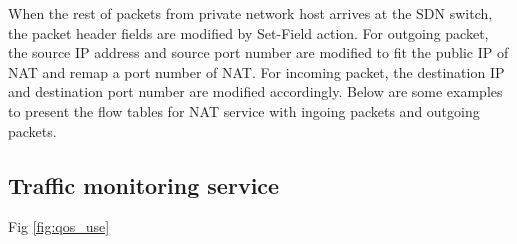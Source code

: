 When the rest of packets from private network host arrives at the SDN switch, the packet header fields are modified by Set-Field action. For outgoing packet, the source IP address and source port number are modified to fit the public IP
of NAT and remap a port number of NAT. For incoming packet, the destination
IP and destination port number are modified accordingly. Below are some
examples to present the flow tables for NAT service with ingoing packets
and outgoing packets.


\subsection{Traffic monitoring service}
Fig \ref{fig:qos_use}
